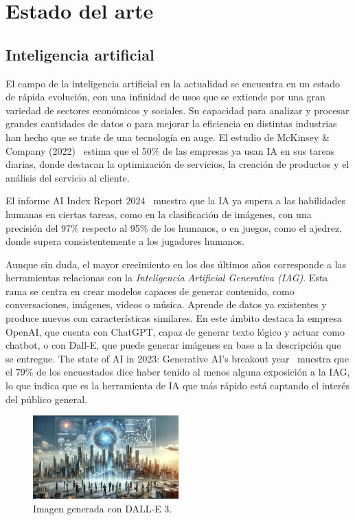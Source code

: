 \chapter{Estado del arte}
\label{ch:estado-arte}

\section{Inteligencia artificial}

El campo de la inteligencia artificial en la actualidad se encuentra en un estado de rápida evolución, con una infinidad de usos que se extiende por una gran variedad de sectores económicos y sociales. Su capacidad para analizar y procesar grandes cantidades de datos o para mejorar la eficiencia en distintas industrias han hecho que se trate de una tecnología en auge. El estudio de McKinsey \& Company (2022)~\cite{mckinsey2022ai} estima que el 50\% de las empresas ya usan IA en sus tareas diarias, donde destacan la optimización de servicios, la creación de productos y el análisis del servicio al cliente.

El informe AI Index Report 2024~\cite{AIIndex2024} muestra que la IA ya supera a las habilidades humanas en ciertas tareas, como en la clasificación de imágenes, con una precisión del 97\% respecto al 95\% de los humanos, o en juegos, como el ajedrez, donde supera consistentemente a los jugadores humanos.

Aunque sin duda, el mayor crecimiento en los dos últimos años corresponde a las herramientas relacionas con la \textit{Inteligencia Artificial Generativa (IAG)}. Esta rama se centra en crear modelos capaces de generar contenido, como conversaciones, imágenes, videos o música. Aprende de datos ya existentes y produce nuevos con características similares. En este ámbito destaca la empresa OpenAI, que cuenta con ChatGPT, capaz de generar texto lógico y actuar como chatbot, o con Dall-E, que puede generar imágenes en base a la descripción que se entregue. The state of AI in 2023: Generative AI's breakout year~\cite{mckinsey2023state} muestra que el 79\% de los encuestados dice haber tenido al menos alguna exposición a la IAG, lo que indica que es la herramienta de IA que más rápido está captando el interés del público general.

\begin{figure}[H]
    \centering
    \includegraphics[width=0.5\textwidth]{figures/dall-e.png}
    \caption{Imagen generada con DALL-E 3.}
    \label{fig:dall-e}
\end{figure}

